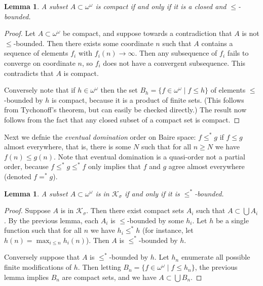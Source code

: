 \documentclass[11pt,oneside]{amsbook}
\newcommand{\R}{\mathbb R}
\theoremstyle{definition}
\theoremstyle{plain}
\newtheorem{lemma}[theorem]{Lemma}
\theoremstyle{definition}
\theoremstyle{remark}
\numberwithin{equation}{section}
\numberwithin{figure}{section}
\begin{document}

\begin{lemma}
  \label{lem:baire-compact}
  A subset $A\subset\omega^\omega$ is compact if and only if it is a closed and $\leq$-bounded.
\end{lemma}

\begin{proof}
  Let $A\subset\omega^\omega$ be compact, and suppose towards a contradiction that $A$ is not $\leq$-bounded. Then there exists some coordinate $n$ such that $A$ contains a sequence of elements $f_i$ with $f_i(n)\to\infty$. Then any subsequence of $f_i$ fails to converge on coordinate $n$, so $f_i$ does not have a convergent subsequence. This contradicts that $A$ is compact.

  Conversely note that if $h\in\omega^\omega$ then the set $B_h=\{f\in\omega^\omega\mid f\leq h\}$ of elements $\leq$-bounded by $h$ is compact, because it is a product of finite sets. (This follows from Tychonoff's theorem, but can easily be checked directly.) The result now follows from the fact that any closed subset of a compact set is compact.
\end{proof}

Next we defnie the \emph{eventual domination} order on Baire space: $f\leq^*g$ if $f\leq g$ almost everywhere, that is, there is some $N$ such that for all $n\geq N$ we have $f(n)\leq g(n)$. Note that eventual domination is a quasi-order not a partial order, because $f\leq^*g\leq^*f$ only implies that $f$ and $g$ agree almost everywhere (denoted $f=^*g$).

\begin{lemma}
  \label{lem:sigma-compact-bounded}
  A subset $A\subset\omega^\omega$ is in $\mathcal K_\sigma$ if and only if it is $\leq^*$-bounded.
\end{lemma}

\begin{proof}
  Suppose $A$ is in $\mathcal K_\sigma$. Then there exist compact sets $A_i$ such that $A\subset\bigcup A_i$. By the previous lemma, each $A_i$ is $\leq$-bounded by some $h_i$. Let $h$ be a single function such that for all $n$ we have $h_i\leq^* h$ (for instance, let $h(n)=\max_{i\leq n}h_i(n)$). Then $A$ is $\leq^*$-bounded by $h$.

  Conversely suppose that $A$ is $\leq^*$-bounded by $h$. Let $h_n$ enumerate all possible finite modifications of $h$. Then letting $B_n=\{f\in\omega^\omega\mid f\leq h_n\}$, the previous lemma implies $B_n$ are compact sets, and we have $A\subset\bigcup B_n$.
\end{proof}
\end{document}

